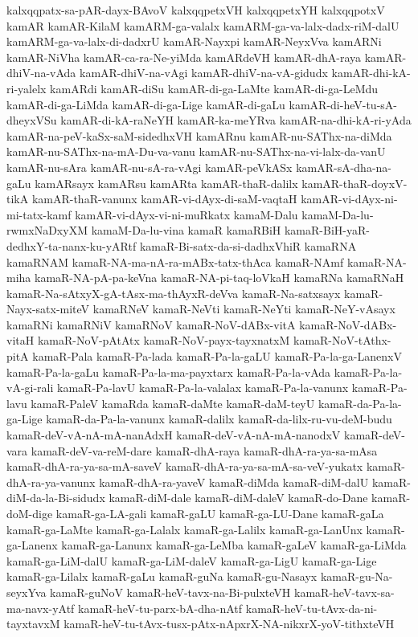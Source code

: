 {kalxqqpatx-sa-pAR-dayx-BAvoV
kalxqqpetxVH
kalxqqpetxYH
kalxqqpotxV
kamAR
kamAR-KilaM
kamARM-ga-valalx
kamARM-ga-va-lalx-dadx-riM-dalU
kamARM-ga-va-lalx-di-dadxrU
kamAR-Nayxpi
kamAR-NeyxVva
kamARNi
kamAR-NiVha
kamAR-ca-ra-Ne-yiMda
kamARdeVH
kamAR-dhA-raya
kamAR-dhiV-na-vAda
kamAR-dhiV-na-vAgi
kamAR-dhiV-na-vA-gidudx
kamAR-dhi-kA-ri-yalelx
kamARdi
kamAR-diSu
kamAR-di-ga-LaMte
kamAR-di-ga-LeMdu
kamAR-di-ga-LiMda
kamAR-di-ga-Lige
kamAR-di-gaLu
kamAR-di-heV-tu-sA-dheyxVSu
kamAR-di-kA-raNeYH
kamAR-ka-meYRva
kamAR-na-dhi-kA-ri-yAda
kamAR-na-peV-kaSx-saM-sidedhxVH
kamARnu
kamAR-nu-SAThx-na-diMda
kamAR-nu-SAThx-na-mA-Du-va-vanu
kamAR-nu-SAThx-na-vi-lalx-da-vanU
kamAR-nu-sAra
kamAR-nu-sA-ra-vAgi
kamAR-peVkASx
kamAR-sA-dha-na-gaLu
kamARsayx
kamARsu
kamARta
kamAR-thaR-dalilx
kamAR-thaR-doyxV-tikA
kamAR-thaR-vanunx
kamAR-vi-dAyx-di-saM-vaqtaH
kamAR-vi-dAyx-ni-mi-tatx-kamf
kamAR-vi-dAyx-vi-ni-muRkatx
kamaM-Dalu
kamaM-Da-lu-rwmxNaDxyXM
kamaM-Da-lu-vina
kamaR
kamaRBiH
kamaR-BiH-yaR-dedhxY-ta-nanx-ku-yARtf
kamaR-Bi-satx-da-si-dadhxVhiR
kamaRNA
kamaRNAM
kamaR-NA-ma-nA-ra-mABx-tatx-thAca
kamaR-NAmf
kamaR-NA-miha
kamaR-NA-pA-pa-keVna
kamaR-NA-pi-taq-loVkaH
kamaRNa
kamaRNaH
kamaR-Na-sAtxyX-gA-tAsx-ma-thAyxR-deVva
kamaR-Na-satxsayx
kamaR-Nayx-satx-miteV
kamaRNeV
kamaR-NeVti
kamaR-NeYti
kamaR-NeY-vAsayx
kamaRNi
kamaRNiV
kamaRNoV
kamaR-NoV-dABx-vitA
kamaR-NoV-dABx-vitaH
kamaR-NoV-pAtAtx
kamaR-NoV-payx-tayxnatxM
kamaR-NoV-tAthx-pitA
kamaR-Pala
kamaR-Pa-lada
kamaR-Pa-la-gaLU
kamaR-Pa-la-ga-LanenxV
kamaR-Pa-la-gaLu
kamaR-Pa-la-ma-payxtarx
kamaR-Pa-la-vAda
kamaR-Pa-la-vA-gi-rali
kamaR-Pa-lavU
kamaR-Pa-la-valalax
kamaR-Pa-la-vanunx
kamaR-Pa-lavu
kamaR-PaleV
kamaRda
kamaR-daMte
kamaR-daM-teyU
kamaR-da-Pa-la-ga-Lige
kamaR-da-Pa-la-vanunx
kamaR-dalilx
kamaR-da-lilx-ru-vu-deM-budu
kamaR-deV-vA-nA-mA-nanAdxH
kamaR-deV-vA-nA-mA-nanodxV
kamaR-deV-vara
kamaR-deV-va-reM-dare
kamaR-dhA-raya
kamaR-dhA-ra-ya-sa-mAsa
kamaR-dhA-ra-ya-sa-mA-saveV
kamaR-dhA-ra-ya-sa-mA-sa-veV-yukatx
kamaR-dhA-ra-ya-vanunx
kamaR-dhA-ra-yaveV
kamaR-diMda
kamaR-diM-dalU
kamaR-diM-da-la-Bi-sidudx
kamaR-diM-dale
kamaR-diM-daleV
kamaR-do-Dane
kamaR-doM-dige
kamaR-ga-LA-gali
kamaR-gaLU
kamaR-ga-LU-Dane
kamaR-gaLa
kamaR-ga-LaMte
kamaR-ga-Lalalx
kamaR-ga-Lalilx
kamaR-ga-LanUnx
kamaR-ga-Lanenx
kamaR-ga-Lanunx
kamaR-ga-LeMba
kamaR-gaLeV
kamaR-ga-LiMda
kamaR-ga-LiM-dalU
kamaR-ga-LiM-daleV
kamaR-ga-LigU
kamaR-ga-Lige
kamaR-ga-Lilalx
kamaR-gaLu
kamaR-guNa
kamaR-gu-Nasayx
kamaR-gu-Na-seyxYva
kamaR-guNoV
kamaR-heV-tavx-na-Bi-pulxteVH
kamaR-heV-tavx-sa-ma-navx-yAtf
kamaR-heV-tu-parx-bA-dha-nAtf
kamaR-heV-tu-tAvx-da-ni-tayxtavxM
kamaR-heV-tu-tAvx-tusx-pAtx-nApxrX-NA-nikxrX-yoV-tithxteVH
}
